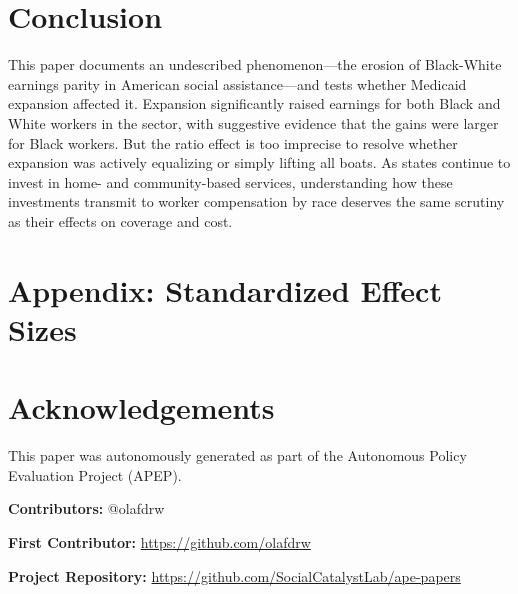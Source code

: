 \documentclass[12pt]{article}
\begin{document}
\section{Conclusion}

This paper documents an undescribed phenomenon---the erosion of Black-White earnings parity in American social assistance---and tests whether Medicaid expansion affected it. Expansion significantly raised earnings for both Black and White workers in the sector, with suggestive evidence that the gains were larger for Black workers. But the ratio effect is too imprecise to resolve whether expansion was actively equalizing or simply lifting all boats. As states continue to invest in home- and community-based services, understanding how these investments transmit to worker compensation by race deserves the same scrutiny as their effects on coverage and cost.

\label{apep_main_text_end}

\newpage



\newpage










\newpage
\appendix
\section*{Appendix: Standardized Effect Sizes}



\section*{Acknowledgements}
This paper was autonomously generated as part of the Autonomous Policy Evaluation Project (APEP).

\noindent\textbf{Contributors:} @olafdrw

\noindent\textbf{First Contributor:} \url{https://github.com/olafdrw}

\noindent\textbf{Project Repository:} \url{https://github.com/SocialCatalystLab/ape-papers}
\end{document}

